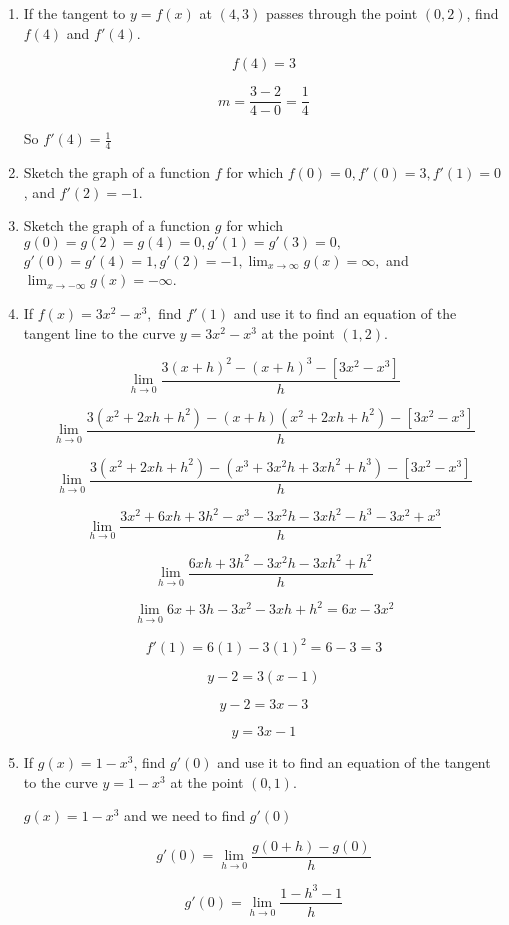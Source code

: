 \documentclass{article}
\begin{document}
\begin{enumerate}
		\item If the tangent to $y = f(x)$ at $(4,3)$ passes through the point $(0,2)$, find $f(4)$ and
			$f'(4)$.

			$$f(4) = 3$$

			$$m = \frac{3 - 2}{4 - 0} = \frac{1}{4}$$

			So $f'(4) = \frac{1}{4}$

		\item Sketch the graph of a function $f$ for which $f(0) = 0, f'(0) = 3, f'(1) = 0$, and
			$f'(2) = -1$.

		\item Sketch the graph of a function $g$ for which
			$g(0) = g(2) = g(4) = 0, g'(1) = g'(3) = 0,$
			$g'(0) = g'(4) = 1, g'(2) = -1, \lim _{x \to \infty} g(x) = \infty,$
			and $\lim _{x \to -\infty} g(x) = -\infty$.

		\item If $f(x) = 3x^2 - x^3,$ find $f'(1)$ and use it to find an equation of the tangent
			line to the curve $y = 3x^2 - x^3$ at the point $(1,2)$.

			$$\lim \limits _{h \to 0} \frac{3(x+h)^2 - (x+h)^3 - [3x^2-x^3]}{h}$$

			$$\lim \limits _{h \to 0} \frac{3(x^2+2xh+h^2)-(x+h)(x^2+2xh+h^2) - [3x^2-x^3]}{h}$$

			$$\lim \limits _{h \to 0} \frac{3(x^2+2xh+h^2)-(x^3+3x^2h+3xh^2+h^3) - [3x^2-x^3]}{h}$$

			$$\lim \limits _{h \to 0} \frac{3x^2+6xh+3h^2-x^3-3x^2h-3xh^2-h^3-3x^2+x^3}{h}$$

			$$\lim \limits _{h \to 0} \frac{6xh+3h^2-3x^2h-3xh^2+h^2}{h}$$

			$$\lim \limits _{h \to 0} 6x + 3h - 3x^2 - 3xh + h^2 = 6x - 3x^2$$

			$$f'(1) = 6(1)-3(1)^2 = 6-3 = 3$$

			$$y - 2 = 3(x - 1)$$

			$$y - 2 = 3x - 3$$

			$$y = 3x - 1$$

		\item If $g(x) = 1 - x^3$, find $g'(0)$ and use it to find an equation of the tangent to the 
			curve $y = 1 - x^3$ at the point $(0,1)$.

		$g(x) = 1 - x^3$ and we need to find $g'(0)$

		$$g'(0) = \lim \limits _{h \to 0} \frac{g(0+h) - g(0)}{h}$$

		$$g'(0) = \lim \limits _{h \to 0} \frac{1 - h^3 - 1}{h}$$


\end{enumerate}
\end{document}
